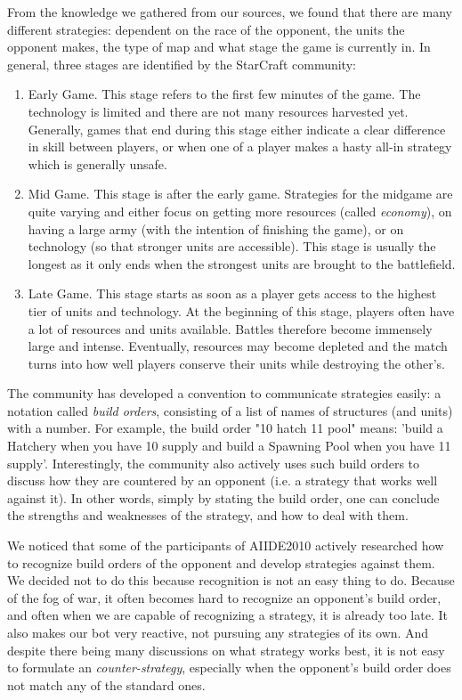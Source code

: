 From the knowledge we gathered from our sources, we found that there are many different strategies: dependent on the race of the opponent, the units the opponent makes, the type of map and what stage the game is currently in. In general, three stages are identified by the StarCraft community:
\begin{enumerate}
\item Early Game. This stage refers to the first few minutes of the game. The technology is limited and there are not many resources harvested yet. Generally, games that end during this stage either indicate a clear difference in skill between players, or when one of a player makes a hasty all-in strategy which is generally unsafe.
\item Mid Game. This stage is after the early game. Strategies for the midgame are quite varying and either focus on getting more resources (called \emph{economy}), on having a large army (with the intention of finishing the game), or on technology (so that stronger units are accessible). This stage is usually the longest as it only ends when the strongest units are brought to the battlefield.
\item Late Game. This stage starts as soon as a player gets access to the highest tier of units and technology. At the beginning of this stage, players often have a lot of resources and units available. Battles therefore become immensely large and intense. Eventually, resources may become depleted and the match turns into how well players conserve their units while destroying the other's.
\end{enumerate}

The community has developed a convention to communicate strategies easily: a notation called \emph{build orders}, consisting of a list of names of structures (and units) with a number. For example, the build order "10 hatch 11 pool" means: 'build a Hatchery when you have 10 supply and build a Spawning Pool when you have 11 supply'. Interestingly, the community also actively uses such build orders to discuss how they are countered by an opponent (i.e. a strategy that works well against it). In other words, simply by stating the build order, one can conclude the strengths and weaknesses of the strategy, and how to deal with them.

We noticed that some of the participants of AIIDE2010 actively researched how to recognize build orders of the opponent and develop strategies against them. We decided not to do this because recognition is not an easy thing to do. Because of the fog of war, it often becomes hard to recognize an opponent's build order, and often when we are capable of recognizing a strategy, it is already too late. It also makes our bot very reactive, not pursuing any strategies of its own. And despite there being many discussions on what strategy works best, it is not easy to formulate an \emph{counter-strategy}, especially when the opponent's build order does not match any of the standard ones.

